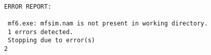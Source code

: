{\small
\begin{lstlisting}[style=modeloutput]

ERROR REPORT:

 mf6.exe: mfsim.nam is not present in working directory.
 1 errors detected.
 Stopping due to error(s)
2

\end{lstlisting}
}
